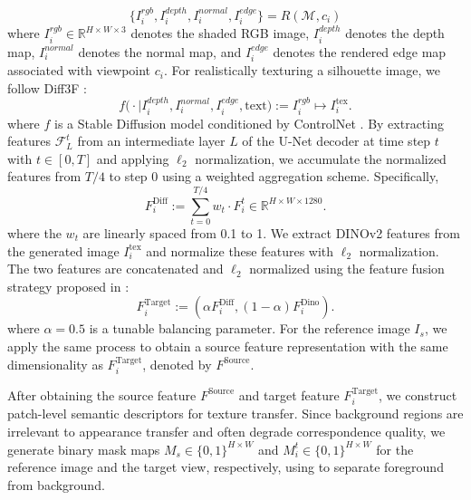 \documentclass{article}
\begin{document}
\begin{equation}
\{I_i^{rgb}, I_i^{depth}, I_i^{normal}, I_i^{edge}\} = R(\mathcal{M}, c_i)
\end{equation}
where $I_i^{rgb} \in \mathbb{R}^{H \times W \times 3}$ denotes the shaded RGB image, $I_i^{depth}$ denotes the depth map, $I_i^{normal}$ denotes the normal map, and $I_i^{edge}$ denotes the rendered edge map associated with viewpoint $c_i$.
For realistically texturing a silhouette image, we follow Diff3F \cite{dutt2024diffusion}:
\begin{equation}
f\bigl(\cdot \mid I_i^{depth}, I_i^{normal}, I_i^{edge}, \text{text}\bigr) := I_i^{rgb} \mapsto I^{\mathrm{tex}}_i.
\end{equation}
where $f$ is a Stable Diffusion model conditioned by ControlNet \cite{Zhang_2023_ICCV}.
By extracting features $\mathcal{F}_L^t$ from an intermediate layer $L$ of the U-Net decoder at time step $t$ with $t \in [0, T]$ and applying $\ell_2$ normalization, we accumulate the normalized features from $T/4$ to step $0$ using a weighted aggregation scheme. Specifically,
\begin{equation}
F^{\mathrm{Diff}}_i := \sum_{t=0}^{T/4} w_t \cdot F_i^t \in \mathbb{R}^{H \times W \times 1280}.
\end{equation}
where the $w_t$ are linearly spaced from 0.1 to 1. We extract DINOv2 features \cite{oquab2023dinov2} from the generated image $I^{\mathrm{tex}}_i$ and normalize these features with $\ell_2$ normalization. The two features are concatenated and $\ell_2$ normalized using the feature fusion strategy proposed in \cite{zhang2023tale}:
\begin{equation}
F^{\mathrm{Target}}_i := \left(\alpha F^{\mathrm{Diff}}_i, (1 - \alpha) F^{\mathrm{Dino}}_i\right).
\end{equation}
where $\alpha = 0.5$ is a tunable balancing parameter. For the reference image $I_s$, we apply the same process to obtain a source feature representation with the same dimensionality as $F^{\mathrm{Target}}_i$, denoted by $F^{\mathrm{Source}}$.

After obtaining the source feature $F^{\mathrm{Source}}$ and target feature $F^{\mathrm{Target}}_i$, we construct patch-level semantic descriptors for texture transfer. Since background regions are irrelevant to appearance transfer and often degrade correspondence quality, we generate binary mask maps $M_s \in \{0,1\}^{H \times W}$ and $M_i^t \in \{0,1\}^{H \times W}$ for the reference image and the target view, respectively, using \cite{zheng2024birefnet} to separate foreground from background.
\end{document}
